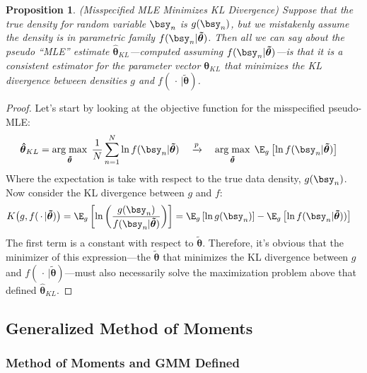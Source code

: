 \documentclass[12pt]{article}
\theoremstyle{plain}
\newtheorem{prop}[thm]{Proposition}
\theoremstyle{definition}
\theoremstyle{remark}
\newcommand{\bstheta}{\boldsymbol{\theta}}
\newcommand{\bshattheta}{\boldsymbol{\hat{\theta}}}
\newcommand{\bstildetheta}{\boldsymbol{\tilde{\theta}}}
\DeclareMathOperator*{\argmax}{arg\;max}
\newcommand{\pto}{\xrightarrow{p}}
\newcommand{\sumnN}{\sum^N_{n=1}}
\begin{document}
\begin{prop}\emph{(Misspecified MLE Minimizes KL Divergence)}
Suppose that the true density for random variable $\bsy_n$ is
$g(\bsy_n)$, but we mistakenly assume the density is in parametric
family $f(\bsy_n|\bstildetheta)$. Then all we can say about the pseudo
``MLE'' estimate $\bshattheta_{KL}$---computed assuming
$f(\bsy_n|\bstildetheta)$---is that it is a consistent estimator for the
parameter vector $\bstheta_{KL}$ that minimizes the KL divergence
between densities $g$ and $f(\,\cdot\,|\bstildetheta)$.
\end{prop}
\begin{proof}
Let's start by looking at the objective function for the misspecified
pseudo-MLE:
\begin{align*}
  \bshattheta_{KL}
  &=
  \argmax_{\bstildetheta}\;
  \frac{1}{N} \sumnN
  \ln f(\bsy_n|\bstildetheta)
  \quad
  \pto\quad
  \argmax_{\bstildetheta}\;
  \E_g\left[
  \ln f(\bsy_n|\bstildetheta)
  \right]
\end{align*}
Where the expectation is take with respect to the true data density,
$g(\bsy_n)$. Now consider the KL divergence between $g$ and $f$:
\begin{align*}
  K\big(g,f(\,\cdot\,|\bstildetheta)\big)
  &= \E_g\left[
  \ln\left(\frac{g(\bsy_n)}{f(\bsy_n|\bstildetheta)}\right)
  \right]
  =
  \E_g\left[
  \ln g(\bsy_n)
  \right]
  -
  \E_g\left[
  \ln f(\bsy_n|\bstildetheta))
  \right]
\end{align*}
The first term is a constant with respect to $\bstildetheta$. Therefore,
it's obvious that the minimizer of this expression---the $\bstildetheta$
that minimizes the KL divergence between $g$ and
$f(\,\cdot\,|\bstildetheta)$---must also necessarily solve the
maximization problem above that defined $\bshattheta_{KL}$.
\end{proof}


\clearpage
\subsection{Generalized Method of Moments}

\subsubsection{Method of Moments and GMM Defined}
\end{document}
